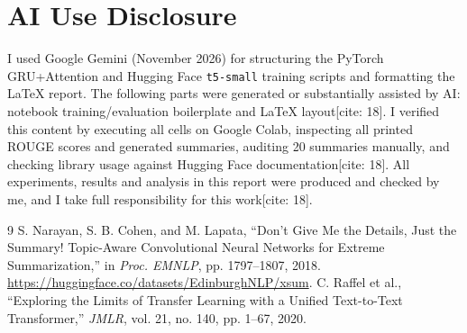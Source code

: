 \documentclass[10pt,twocolumn,a4paper]{IEEEtran}
\begin{document}
\section*{AI Use Disclosure}
I used Google Gemini (November 2026) for structuring the PyTorch GRU+Attention and Hugging Face \texttt{t5-small} training scripts and formatting the LaTeX report. The following parts were generated or substantially assisted by AI: notebook training/evaluation boilerplate and LaTeX layout[cite: 18]. I verified this content by executing all cells on Google Colab, inspecting all printed ROUGE scores and generated summaries, auditing 20 summaries manually, and checking library usage against Hugging Face documentation[cite: 18]. All experiments, results and analysis in this report were produced and checked by me, and I take full responsibility for this work[cite: 18].

\begin{thebibliography}{9}
S. Narayan, S. B. Cohen, and M. Lapata, ``Don't Give Me the Details, Just the Summary! Topic-Aware Convolutional Neural Networks for Extreme Summarization,'' in \textit{Proc. EMNLP}, pp. 1797--1807, 2018. \url{https://huggingface.co/datasets/EdinburghNLP/xsum}.
C. Raffel et al., ``Exploring the Limits of Transfer Learning with a Unified Text-to-Text Transformer,'' \textit{JMLR}, vol. 21, no. 140, pp. 1--67, 2020.
\end{thebibliography}
\end{document}
